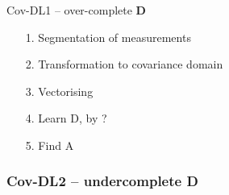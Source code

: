   
\begin{algorithm}[H]
\caption{Cov-DL1 -- over-complete $\mathbf{D}$}
\begin{itemize}
\item[1.] Segmentation of measurements 
\item[2.] Transformation to covariance domain
\item[3.] Vectorising 
\item[4.] Learn D, by ?
\item[5.] Find A
\end{itemize}
\end{algorithm}


\subsubsection*{Cov-DL2 -- undercomplete \textbf{D}}



